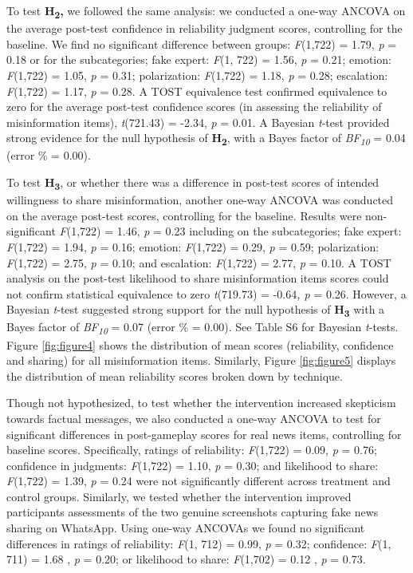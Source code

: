 \documentclass[empirical, authordate]{jote-new-article}
\begin{document}
To test \textbf{H}\textsubscript{\textbf{2}}\textbf{, }we followed the same analysis: we conducted a one-way ANCOVA on the average post-test confidence in reliability judgment scores, controlling for the baseline. We find no significant difference between groups: \emph{F}(1,722) = 1.79,\emph{ p} = 0.18 or for the subcategories; fake expert: \emph{F}(1, 722) = 1.56, \emph{p} = 0.21; emotion: \emph{F}(1,722) = 1.05, \emph{p} = 0.31; polarization: \emph{F}(1,722) = 1.18, \emph{p} = 0.28; escalation: \emph{F}(1,722) = 1.17, \emph{p} = 0.28. A TOST equivalence test confirmed equivalence to zero for the average post-test confidence scores (in assessing the reliability of misinformation items), \emph{t}(721.43) = -2.34, \emph{p }= 0.01. A Bayesian \emph{t}-test provided strong evidence for the null hypothesis of \textbf{H}\textsubscript{\textbf{2}}, with a Bayes factor of \emph{BF}\textsubscript{\emph{10 }}= 0.04 (error \% = 0.00).\textbf{ }

To test \textbf{H}\textsubscript{\textbf{3}}, or whether there was a difference in post-test scores of intended willingness to share misinformation, another one-way ANCOVA was conducted on the average post-test scores, controlling for the baseline. Results were non-significant \emph{F}(1,722) = 1.46, \emph{p }= 0.23 including on the subcategories; fake expert: \emph{F}(1,722) = 1.94, \emph{p }= 0.16; emotion: \emph{F}(1,722) = 0.29, \emph{p} = 0.59; polarization: \emph{F}(1,722) = 2.75, \emph{p} = 0.10; and escalation: \emph{F}(1,722) = 2.77, \emph{p} = 0.10. A TOST analysis on the post-test likelihood to share misinformation items scores could not confirm statistical equivalence to zero \emph{t}(719.73) = -0.64\emph{, p} = 0.26. However, a Bayesian \emph{t}-test suggested strong support for the null hypothesis of \textbf{H}\textsubscript{\textbf{3}}\textbf{ }with\textbf{ }a\textbf{ }Bayes factor of \emph{BF}\textsubscript{\emph{10}} = 0.07 (error \% = 0.00). See Table S6 for Bayesian \emph{t}-tests. Figure \ref{fig:figure4} shows the distribution of mean scores (reliability, confidence and sharing) for all misinformation items. Similarly, Figure \ref{fig:figure5} displays the distribution of mean reliability scores broken down by technique.

Though not hypothesized, to test whether the intervention increased skepticism towards factual messages, we also conducted a one-way ANCOVA to test for significant differences in post-gameplay scores for real news items, controlling for baseline scores. Specifically, ratings of reliability: \emph{F}(1,722) = 0.09, \emph{p} = 0.76; confidence in judgments: \emph{F}(1,722) = 1.10, \emph{p} = 0.30; and likelihood to share: \emph{F}(1,722) = 1.39, \emph{p }= 0.24 were not significantly different across treatment and control groups. Similarly, we tested whether the intervention improved participants assessments of the two genuine screenshots capturing fake news sharing on \mbox{WhatsApp}. Using one-way ANCOVAs we found no significant differences in ratings of reliability: \emph{F}(1, 712) = 0.99, \emph{p} = 0.32; confidence: \emph{F}(1, 711) = 1.68 , \emph{p }= 0.20; or likelihood to share: \emph{F}(1,702) = 0.12 , \emph{p }= 0.73.
\end{document}
